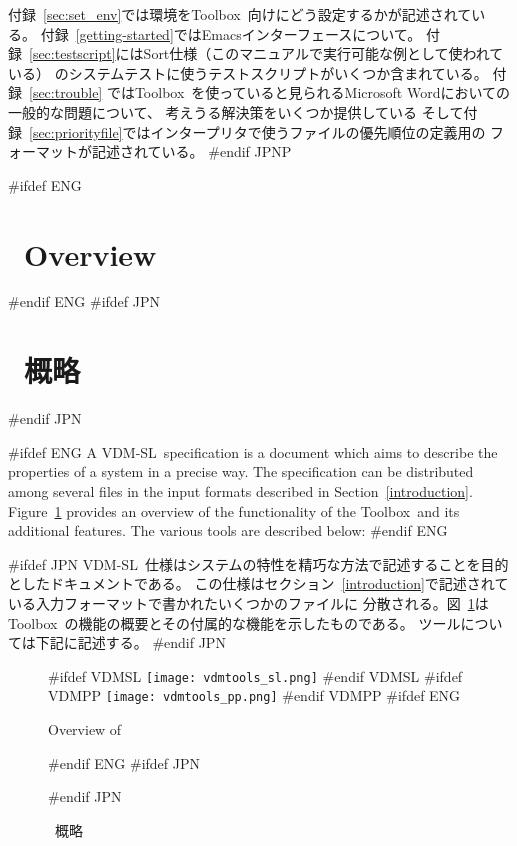 \documentclass[\pformat,12pt]{article}
\newcommand{\vdmslpp}{VDM-SL}
\newcommand{\Toolbox}{Toolbox}
\newcommand{\vdmslpp}{VDM++}
\newcommand{\Toolbox}{Toolbox}
\begin{document}
付録~\ref{sec:set_env}では環境を\Toolbox\ 向けにどう設定するかが記述されている。
付録~\ref{getting-started}ではEmacsインターフェースについて。
付録~\ref{sec:testscript}にはSort仕様（このマニュアルで実行可能な例として使われている）
のシステムテストに使うテストスクリプトがいくつか含まれている。
付録~\ref{sec:trouble} では\Toolbox\ を使っていると見られるMicrosoft Wordにおいての一般的な問題について、
考えうる解決策をいくつか提供している
{そして付録~\ref{sec:priorityfile}ではインタープリタで使うファイルの優先順位の定義用の
フォーマットが記述されている。}
#endif JPNP

\newpage

#ifdef ENG
\section{\protect\VDMTools\ Overview}\label{sec:overview}
#endif ENG
#ifdef JPN
\section{\protect\VDMTools\ 概略}\label{sec:overview}
#endif JPN

#ifdef ENG
A \vdmslpp\ specification is a document which aims to describe the
properties of a system in a precise way. The specification can be
distributed among several files in the input formats described in
Section~\ref{introduction}.  Figure~\ref{fig:toolbox} provides an
overview of the functionality of the \Toolbox\ and its additional
features. The various tools are described below:
#endif ENG

#ifdef JPN
\vdmslpp\ 仕様はシステムの特性を精巧な方法で記述することを目的としたドキュメントである。
この仕様はセクション~\ref{introduction}で記述されている入力フォーマットで書かれたいくつかのファイルに
分散される。図~\ref{fig:toolbox}は\Toolbox\ の機能の概要とその付属的な機能を示したものである。
ツールについては下記に記述する。
#endif JPN

\begin{figure}
\begin{center}

#ifdef VDMSL
\texttt{[image: vdmtools\_sl.png]}
#endif VDMSL
#ifdef VDMPP
\texttt{[image: vdmtools\_pp.png]}
#endif VDMPP
#ifdef ENG
\caption{Overview of \protect\VDMTools}
#endif ENG
#ifdef JPN
\caption{\protect\VDMTools\ 概略}
#endif JPN
\label{fig:toolbox}
\end{center}
\end{figure}
\end{document}
